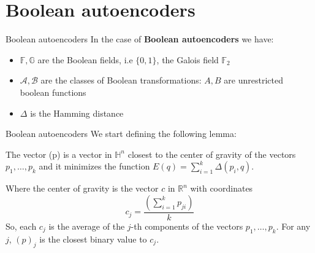 \documentclass[9pt]{beamer}
\begin{document}
\section{Boolean autoencoders}
\begin{frame}{Boolean autoencoders}
    In the case of \textbf{Boolean autoencoders} we have:
    \begin{itemize}
        \item $\mathbb{F},\mathbb{G}$ are the Boolean fields, i.e $\{0,1\}$, the Galois field $\mathbb{F}_2$
        \item $\mathcal{A},\mathcal{B}$ are the classes of Boolean transformations: $A,B$ are unrestricted boolean functions
        \item $\Delta$ is the Hamming distance
    \end{itemize}
\end{frame}

\begin{frame}{Boolean autoencoders}
We start defining the following lemma:
\begin{lemma}
    The vector (p) is a vector in $\mathbb{H}^n$ closest to the center of gravity of the vectors $p_1, \dots, p_k$ and it minimizes the function $E(q) = \sum_{i=1}^k \Delta(p_i, q)$.
\end{lemma}
Where the center of gravity is the vector $c$ in $\mathbb{R}^n$ with coordinates 
\[
    c_j = \dfrac{\left(\sum\limits_{i=1}^{k} p_{ji}\right)}{k}
\]
So, each $c_j$ is the average of the $j$-th components of the vectors $p_1, \dots, p_k$.
For any $j$, $(p)_j$ is the closest binary value to $c_j$.
\end{frame}
\end{document}

